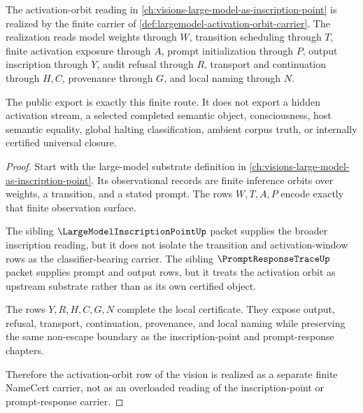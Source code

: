 \begin{theorem}
\label{thm:largemodel-activation-orbit-vision-realization}
The activation-orbit reading in \autoref{ch:visions-large-model-as-inscription-point} is realized by the finite carrier of \autoref{def:largemodel-activation-orbit-carrier}. The realization reads model weights through $W$, transition scheduling through $T$, finite activation exposure through $A$, prompt initialization through $P$, output inscription through $Y$, audit refusal through $R$, transport and continuation through $H,C$, provenance through $G$, and local naming through $N$.

The public export is exactly this finite route. It does not export a hidden activation stream, a selected completed semantic object, consciousness, host semantic equality, global halting classification, ambient corpus truth, or internally certified universal closure.
\end{theorem}
\begin{proof}
Start with the large-model substrate definition in \autoref{ch:visions-large-model-as-inscription-point}. Its observational records are finite inference orbits over weights, a transition, and a stated prompt. The rows $W,T,A,P$ encode exactly that finite observation surface.

The sibling $\LargeModelInscriptionPointUp$ packet supplies the broader inscription reading, but it does not isolate the transition and activation-window rows as the classifier-bearing carrier. The sibling $\PromptResponseTraceUp$ packet supplies prompt and output rows, but it treats the activation orbit as upstream substrate rather than as its own certified object.

The rows $Y,R,H,C,G,N$ complete the local certificate. They expose output, refusal, transport, continuation, provenance, and local naming while preserving the same non-escape boundary as the inscription-point and prompt-response chapters.

Therefore the activation-orbit row of the vision is realized as a separate finite NameCert carrier, not as an overloaded reading of the inscription-point or prompt-response carrier.
\end{proof}

